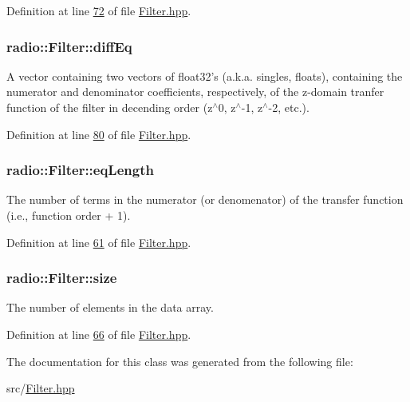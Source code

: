 Definition at line \hyperlink{Filter_8hpp_source_l00072}{72} of file \hyperlink{Filter_8hpp_source}{Filter.\+hpp}.

\hypertarget{classradio_1_1Filter_abe705768a267844edfa2aaabfdac9f56}{
\subsubsection[{diff\+Eq}]{ radio\+::\+Filter\+::diff\+Eq\hspace{0.3cm}{\ttfamily [protected]}}}\label{classradio_1_1Filter_abe705768a267844edfa2aaabfdac9f56}
A vector containing two vectors of float32's (a.\+k.\+a. singles, floats), containing the numerator and denominator coefficients, respectively, of the z-\/domain tranfer function of the filter in decending order (z$^\wedge$0, z$^\wedge$-\/1, z$^\wedge$-\/2, etc.). 

Definition at line \hyperlink{Filter_8hpp_source_l00080}{80} of file \hyperlink{Filter_8hpp_source}{Filter.\+hpp}.

\hypertarget{classradio_1_1Filter_a26a32320c4dffa8925ab5f0f06689e8d}{
\subsubsection[{eq\+Length}]{ radio\+::\+Filter\+::eq\+Length\hspace{0.3cm}{\ttfamily [protected]}}}\label{classradio_1_1Filter_a26a32320c4dffa8925ab5f0f06689e8d}
The number of terms in the numerator (or denomenator) of the transfer function (i.\+e., function order + 1). 

Definition at line \hyperlink{Filter_8hpp_source_l00061}{61} of file \hyperlink{Filter_8hpp_source}{Filter.\+hpp}.

\hypertarget{classradio_1_1Filter_a7285b4c7263d8278e38abb14b5dca5d9}{
\subsubsection[{size}]{ radio\+::\+Filter\+::size\hspace{0.3cm}{\ttfamily [protected]}}}\label{classradio_1_1Filter_a7285b4c7263d8278e38abb14b5dca5d9}
The number of elements in the data array. 

Definition at line \hyperlink{Filter_8hpp_source_l00066}{66} of file \hyperlink{Filter_8hpp_source}{Filter.\+hpp}.



The documentation for this class was generated from the following file\+:\begin{DoxyCompactItemize}
\item 
src/\hyperlink{Filter_8hpp}{Filter.\+hpp}\end{DoxyCompactItemize}
